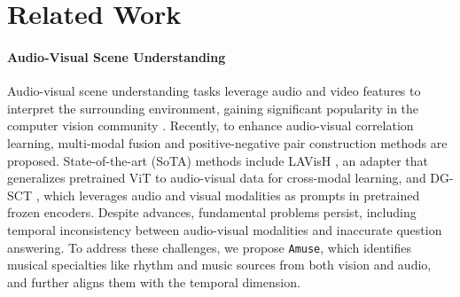 \section{Related Work}
\paragraph{Audio-Visual Scene Understanding}
Audio-visual scene understanding tasks leverage audio and video features to interpret the surrounding environment, gaining significant popularity in the computer vision community \cite{antol2015vqa, zhao2018sound, zhao2019sound, tian2020unified}. Recently, to enhance audio-visual correlation learning, multi-modal fusion \cite{yun2021pano, yang2022avqa, diao2023av} and positive-negative pair construction \cite{li2022learning} methods are proposed. State-of-the-art (SoTA) methods include LAVisH \cite{lin2023vision}, an adapter that generalizes pretrained ViT \cite{dosovitskiy2020image} to audio-visual data for cross-modal learning, and DG-SCT \cite{duan2024cross}, which leverages audio and visual modalities as prompts in pretrained frozen encoders.
Despite advances, fundamental problems persist, including temporal inconsistency between audio-visual modalities and inaccurate question answering. To address these challenges, we propose \texttt{Amuse}, which identifies musical specialties like rhythm and music sources from both vision and audio, and further aligns them with the temporal dimension.


